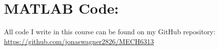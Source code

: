 \documentclass[letter]{article}
\begin{document}
\newpage
\appendix
\section{MATLAB Code:}\label{apx:matlab}
All code I write in this course can be found on my GitHub repository:\\
\href{https://github.com/jonaswagner2826/MECH6313}{https://github.com/jonaswagner2826/MECH6313}

\end{document}
